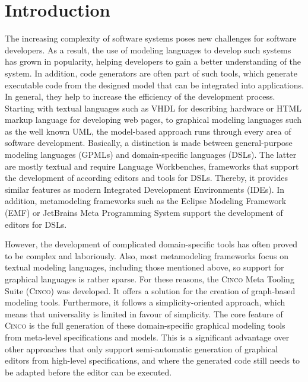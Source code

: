 \chapter{Introduction}
The increasing complexity of software systems poses new challenges for software developers. As a result, the use of modeling languages to develop such systems has grown in popularity, helping developers to gain a better understanding of the system. In addition, code generators are often part of such tools, which generate executable code from the designed model that can be integrated into applications. In general, they help to increase the efficiency of the development process. Starting with textual languages such as VHDL for describing hardware or HTML markup language for developing web pages, to graphical modeling languages such as the well known UML, the model-based approach runs through every area of software development. Basically, a distinction is made between general-purpose modeling languages (GPMLs) and domain-specific languages (DSLs). The latter are mostly textual and require Language Workbenches, frameworks that support the development of according editors and tools for DSLs. Thereby, it provides similar features as modern Integrated Development Environments (IDEs). In addition, metamodeling frameworks such as the Eclipse Modeling Framework (EMF) or JetBrains Meta Programming System support the development of editors for DSLs.~\cite{Lybecait.2018}~\cite{Naujokat.2018}

However, the development of complicated domain-specific tools has often proved to be complex and laboriously. Also, most metamodeling frameworks focus on textual modeling languages, including those mentioned above, so support for graphical languages is rather sparse. For these reasons, the \textsc{Cinco} Meta Tooling Suite (\textsc{Cinco}) was developed. It offers a solution for the creation of graph-based modeling tools. Furthermore, it follows a simplicity-oriented approach, which means that universality is limited in favour of simplicity. The core feature of \textsc{Cinco} is the full generation of these domain-specific graphical modeling tools from meta-level specifications and models. This is a significant advantage over other approaches that only support semi-automatic generation of graphical editors from high-level specifications, and where the generated code still needs to be adapted before the editor can be executed.~\cite{Lybecait.2018}~\cite{Naujokat.2018}

